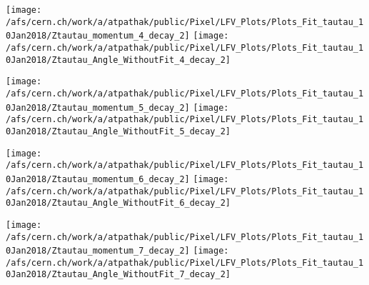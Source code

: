 \documentclass{beamer}
\begin{document}
\begin{frame}
\begin{normalsize}
\begin{center}
\texttt{[image: /afs/cern.ch/work/a/atpathak/public/Pixel/LFV\_Plots/Plots\_Fit\_tautau\_10Jan2018/Ztautau\_momentum\_4\_decay\_2]}
\texttt{[image: /afs/cern.ch/work/a/atpathak/public/Pixel/LFV\_Plots/Plots\_Fit\_tautau\_10Jan2018/Ztautau\_Angle\_WithoutFit\_4\_decay\_2]} 
\end{center}
\end{normalsize}
\end {frame}
\begin{frame}
\begin{normalsize}
\begin{center}
\texttt{[image: /afs/cern.ch/work/a/atpathak/public/Pixel/LFV\_Plots/Plots\_Fit\_tautau\_10Jan2018/Ztautau\_momentum\_5\_decay\_2]}
\texttt{[image: /afs/cern.ch/work/a/atpathak/public/Pixel/LFV\_Plots/Plots\_Fit\_tautau\_10Jan2018/Ztautau\_Angle\_WithoutFit\_5\_decay\_2]} 
\end{center}
\end{normalsize}
\end {frame}
\begin{frame}
\begin{normalsize}
\begin{center}
\texttt{[image: /afs/cern.ch/work/a/atpathak/public/Pixel/LFV\_Plots/Plots\_Fit\_tautau\_10Jan2018/Ztautau\_momentum\_6\_decay\_2]}
\texttt{[image: /afs/cern.ch/work/a/atpathak/public/Pixel/LFV\_Plots/Plots\_Fit\_tautau\_10Jan2018/Ztautau\_Angle\_WithoutFit\_6\_decay\_2]} 
\end{center}
\end{normalsize}
\end {frame}
\begin{frame}
\begin{normalsize}
\begin{center}
\texttt{[image: /afs/cern.ch/work/a/atpathak/public/Pixel/LFV\_Plots/Plots\_Fit\_tautau\_10Jan2018/Ztautau\_momentum\_7\_decay\_2]}
\texttt{[image: /afs/cern.ch/work/a/atpathak/public/Pixel/LFV\_Plots/Plots\_Fit\_tautau\_10Jan2018/Ztautau\_Angle\_WithoutFit\_7\_decay\_2]} 
\end{center}
\end{normalsize}
\end {frame}
\end{document}
